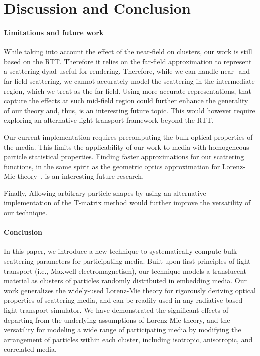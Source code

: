 \section{Discussion and Conclusion}
\label{sec:conclusion}
%
\paragraph{Limitations and future work}
While taking into account the effect of the near-field on clusters, our work is still based on the RTT. Therefore it relies on the far-field approximation to represent a scattering dyad useful for rendering. Therefore, while we can handle near- and far-field scattering, we cannot accurately model the scattering in the intermediate region, which we treat as the far field. Using more accurate representations, that capture the effects at such mid-field region could further enhance the generality of our theory and, thus, is an interesting future topic. This would however require exploring an alternative light transport framework beyond the RTT. 

Our current implementation requires precomputing the bulk optical properties of the media. This limits the applicability of our work to media with homogeneous particle statistical properties. Finding faster approximations for our scattering functions, in the same spirit as the geometric optics approximation for Lorenz-Mie theory~\cite{glantschnig1981light}, is an interesting future research. 

Finally,  Allowing arbitrary particle shapes by using an alternative implementation of the T-matrix method would further improve the versatility of our technique.

\paragraph{Conclusion}
In this paper, we introduce a new technique to systematically compute bulk scattering parameters for participating media. Built upon first principles of light transport (i.e., Maxwell electromagnetism), our technique models a translucent material as clusters of particles randomly distributed in embedding media. Our work generalizes the widely-used Lorenz-Mie theory for rigorously deriving optical properties of scattering media, and can be readily used in any radiative-based light transport simulator. 
%
We have demonstrated the significant effects of departing from the underlying assumptions of Lorenz-Mie theory, and the versatility for modeling a wide range of participating media by modifying the arrangement of particles within each cluster, including isotropic, anisotropic, and correlated media.
